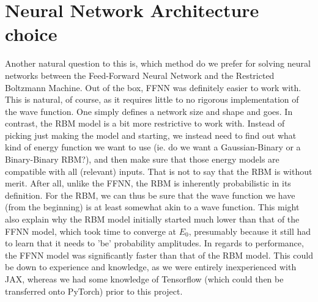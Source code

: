 \documentclass[12pt]{article}
\begin{document}
{\section{Neural Network Architecture choice}
Another natural question to this is, which method do we prefer for solving neural networks between the Feed-Forward Neural Network and the Restricted Boltzmann Machine. Out of the box, FFNN was definitely easier to work with. This is natural, of course, as it requires little to no rigorous implementation of the wave function. One simply defines a network size and shape and goes. In contrast, the RBM model is a bit more restrictive to work with. Instead of picking just making the model and starting, we instead need to find out what kind of energy function we want to use (ie. do we want a Gaussian-Binary or a Binary-Binary RBM?), and then make sure that those energy models are compatible with all (relevant) inputs. That is not to say that the RBM is without merit. After all, unlike the FFNN, the RBM is inherently probabilistic in its definition. For the RBM, we can thus be sure that the wave function we have (from the beginning) is at least somewhat akin to a wave function. This might also explain why the RBM model initially started much lower than that of the FFNN model, which took time to converge at $E_0$, presumably because it still had to learn that it needs to 'be' probability amplitudes. \newline
In regards to performance, the FFNN model was significantly faster than that of the RBM model. This could be down to experience and knowledge, as we were entirely inexperienced with JAX, whereas we had some knowledge of Tensorflow (which could then be transferred onto PyTorch) prior to this project.
}
\end{document}
